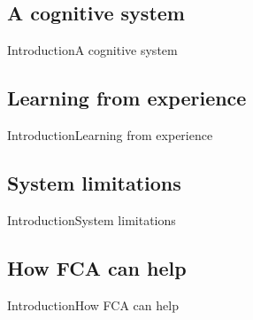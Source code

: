 \subsection{A cognitive system}
\begin{frame}{Introduction}{A cognitive system}
\end{frame}

\subsection{Learning from experience}
\begin{frame}{Introduction}{Learning from experience}
\end{frame}

\subsection{System limitations}
\begin{frame}{Introduction}{System limitations}
\end{frame}

\subsection{How FCA can help}
\begin{frame}{Introduction}{How FCA can help}
\end{frame}